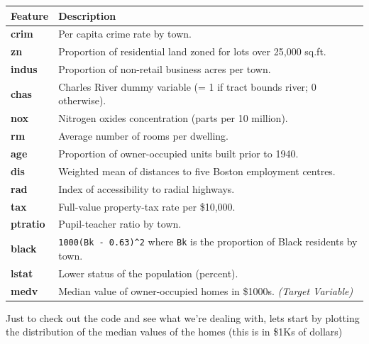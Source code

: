 \documentclass[11pt]{article}
\newcounter{none} %
\begin{document}
{\def\LTcaptype{none} %
\begin{longtable}[]{@{}
  >{\raggedright\arraybackslash}p{}
  >{\raggedright\arraybackslash}p{}@{}}
\toprule\noalign{}
\begin{minipage}[b]{\linewidth}\raggedright
Feature
\end{minipage} & \begin{minipage}[b]{\linewidth}\raggedright
Description
\end{minipage} \\
\midrule\noalign{}
\endhead
\bottomrule\noalign{}
\endlastfoot
\textbf{crim} & Per capita crime rate by town. \\
\textbf{zn} & Proportion of residential land zoned for lots over 25,000
sq.ft. \\
\textbf{indus} & Proportion of non-retail business acres per town. \\
\textbf{chas} & Charles River dummy variable (= 1 if tract bounds river;
0 otherwise). \\
\textbf{nox} & Nitrogen oxides concentration (parts per 10 million). \\
\textbf{rm} & Average number of rooms per dwelling. \\
\textbf{age} & Proportion of owner-occupied units built prior to
1940. \\
\textbf{dis} & Weighted mean of distances to five Boston employment
centres. \\
\textbf{rad} & Index of accessibility to radial highways. \\
\textbf{tax} & Full-value property-tax rate per \$10,000. \\
\textbf{ptratio} & Pupil-teacher ratio by town. \\
\textbf{black} & \texttt{1000(Bk\ -\ 0.63)\^{}2} where \texttt{Bk} is
the proportion of Black residents by town. \\
\textbf{lstat} & Lower status of the population (percent). \\
\textbf{medv} & Median value of owner-occupied homes in \$1000s.
\emph{(Target Variable)} \\
\end{longtable}
}

    Just to check out the code and see what we're dealing with, lets start
by plotting the distribution of the median values of the homes (this is
in \$1Ks of dollars)
\end{document}
